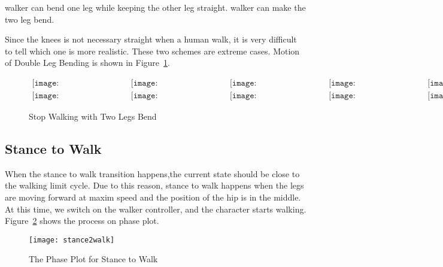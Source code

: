 \begin{itemize}
		walker can bend one leg while keeping the other leg straight.
		walker can make the two leg bend.
\end{itemize}
Since the knees is not necessary straight when a human walk, it is very difficult to tell which one is more realistic. 
These two schemes are extreme cases.
Motion of Double Leg Bending  is shown in Figure~\ref{fig:walkstancestraight}.
\begin{figure}[!htbp]
  \begin{center}
$\begin{array}{ccccc}
\texttt{[image: WalkStanceTransition/0001.eps]}&
\texttt{[image: WalkStanceTransition/0101.eps]}&
\texttt{[image: WalkStanceTransition/0201.eps]}&
\texttt{[image: WalkStanceTransition/0301.eps]}&
\texttt{[image: WalkStanceTransition/0401.eps]}
\\
\texttt{[image: WalkStanceTransition/0501.eps]}&
\texttt{[image: WalkStanceTransition/0601.eps]}&
\texttt{[image: WalkStanceTransition/0701.eps]}&
\texttt{[image: WalkStanceTransition/0801.eps]}&
\texttt{[image: WalkStanceTransition/0901.eps]}
\end{array}$    
    \caption{Stop Walking with Two Legs Bend}
    \label{fig:walkstancestraight}
\end{center}
\end{figure}



\subsection{Stance to Walk}
When the stance to walk transition happens,the current state should  be close to the walking limit cycle.
Due to this reason, stance to walk happens when the legs are moving forward at maxim speed and the position of the hip is in the middle.
At this time, we switch on the walker controller, and the character starts walking.
Figure~\ref{fig:stance2walk} shows the process on phase plot.
\begin{figure}[!htbp]
  \begin{center}
     \texttt{[image: stance2walk]}
    \caption{The Phase Plot for Stance to Walk}
    \label{fig:stance2walk}
\end{center}
\end{figure}



